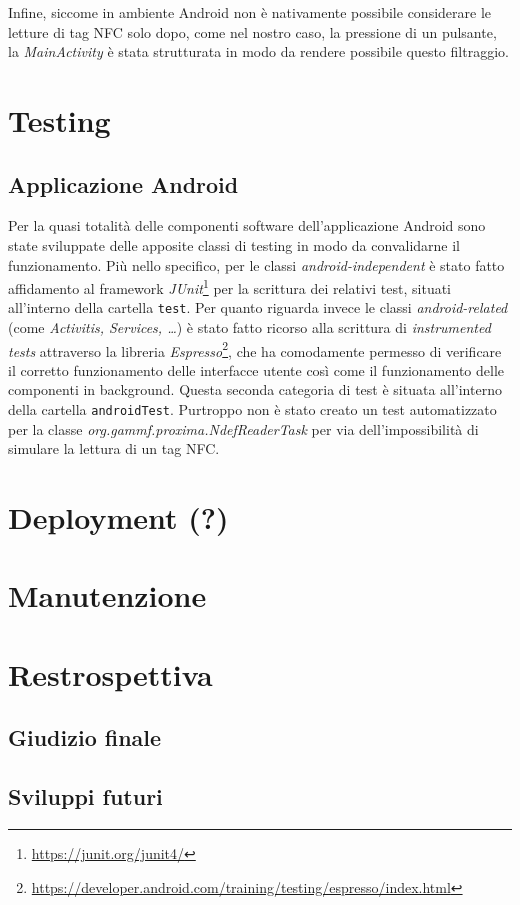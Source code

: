 \documentclass[a4paper,12pt]{report}
\begin{document}
Infine, siccome in ambiente Android non è nativamente possibile considerare le letture di tag NFC solo dopo, come nel nostro caso, la pressione di un pulsante, la \emph{MainActivity} è stata strutturata in modo da rendere possibile questo filtraggio.  

\chapter{Testing} 

\section{Applicazione Android}

Per la quasi totalità delle componenti software dell'applicazione Android sono state sviluppate delle apposite classi di testing in modo da convalidarne il funzionamento. Più nello specifico, per le classi \emph{android-independent} è stato fatto affidamento al framework \emph{JUnit}\footnote{\url{https://junit.org/junit4/}} per la scrittura dei relativi test, situati all'interno della cartella \texttt{test}. Per quanto riguarda invece le classi \emph{android-related} (come \emph{Activitis, Services, \dots}) è stato fatto ricorso alla scrittura di \emph{instrumented tests} attraverso la libreria \emph{Espresso}\footnote{\url{https://developer.android.com/training/testing/espresso/index.html}}, che ha comodamente permesso di verificare il corretto funzionamento delle interfacce utente così come il funzionamento delle componenti in background. Questa seconda categoria di test è situata all'interno della cartella \texttt{androidTest}. Purtroppo non è stato creato un test automatizzato per la classe \emph{org.gammf.proxima.NdefReaderTask} per via dell'impossibilità di simulare la lettura di un tag NFC.

\chapter{Deployment (?)}

\chapter{Manutenzione}

\chapter{Restrospettiva}
\section{Giudizio finale}
\section{Sviluppi futuri}

 
\end{document}
